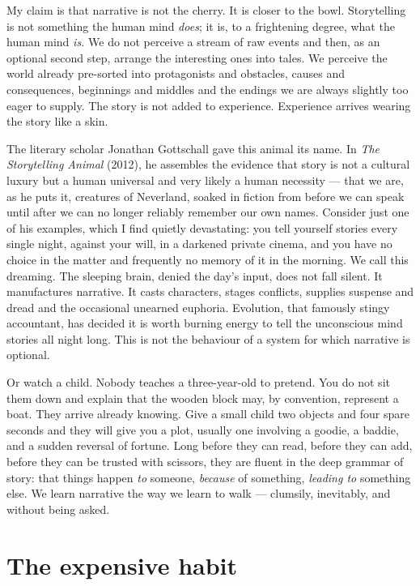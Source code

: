 My claim is that narrative is not the cherry. It is closer to the bowl. Storytelling is not something the human mind \emph{does}; it is, to a frightening degree, what the human mind \emph{is.} We do not perceive a stream of raw events and then, as an optional second step, arrange the interesting ones into tales. We perceive the world already pre-sorted into protagonists and obstacles, causes and consequences, beginnings and middles and the endings we are always slightly too eager to supply. The story is not added to experience. Experience arrives wearing the story like a skin.

The literary scholar Jonathan Gottschall gave this animal its name. In \emph{The Storytelling Animal} (2012), he assembles the evidence that story is not a cultural luxury but a human universal and very likely a human necessity — that we are, as he puts it, creatures of Neverland, soaked in fiction from before we can speak until after we can no longer reliably remember our own names. Consider just one of his examples, which I find quietly devastating: you tell yourself stories every single night, against your will, in a darkened private cinema, and you have no choice in the matter and frequently no memory of it in the morning. We call this dreaming. The sleeping brain, denied the day's input, does not fall silent. It manufactures narrative. It casts characters, stages conflicts, supplies suspense and dread and the occasional unearned euphoria. Evolution, that famously stingy accountant, has decided it is worth burning energy to tell the unconscious mind stories all night long. This is not the behaviour of a system for which narrative is optional.

Or watch a child. Nobody teaches a three-year-old to pretend. You do not sit them down and explain that the wooden block may, by convention, represent a boat. They arrive already knowing. Give a small child two objects and four spare seconds and they will give you a plot, usually one involving a goodie, a baddie, and a sudden reversal of fortune. Long before they can read, before they can add, before they can be trusted with scissors, they are fluent in the deep grammar of story: that things happen \emph{to} someone, \emph{because} of something, \emph{leading to} something else. We learn narrative the way we learn to walk — clumsily, inevitably, and without being asked.

\section*{The expensive habit}

